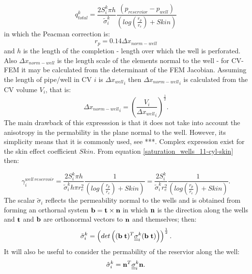 \begin{equation}
q_{total}^k = \frac{2 S_i^k \pi h}{\tilde\sigma_i^{k} }\frac{(p_{reservior}- p_{well})}{ ( log(\frac{r_p}{r_e}) + Skin)}
\label{saturation_wells_11-cyl-skin}
\end{equation}
in which the Peacman correction is:
\begin{equation}
r_p= 0.14 \Delta x_{norm-well}
\end{equation}
and $h$ is the length of the completion - length over which the well is perforated. Also $\Delta x_{norm-well}$
is  the length scale of the elements normal to the well - for CV-FEM it may be calculated from the determinant of the FEM Jacobian.
Assuming the length of pipe/well in CV $i$ is ${\Delta x_{well}}_i$ then ${\Delta x_{norm-well}}_i$ is
calculated from the CV volume $V_i$, that is:
\begin{equation}
 {\Delta x_{norm-well}}_i = \left(
\frac{V_i}{ {\Delta x_{well}}_i }
\right)^\frac{1}{2} .
\end{equation}
The main drawback of this expresssion is that it does not take into account
the anisotropy in the permability in the plane normal to the well. However, its simplicity means that it is commonly
used, see ***.
Complex expression exist for the skin effect coefficient $Skin$.
From equation \ref{saturation_wells_11-cyl-skin} then:

\begin{equation}
\gamma_{i}^{well\, reservoir}
=\frac{2 S_i^k \pi h}{ \tilde\sigma_i^k h\pi r_e^2} \frac{1}{ ( log(\frac{r_p}{r_e}) + Skin)}
=\frac{2 S_i^k }{\tilde\sigma_i^k r_e^2} \frac{1}{ ( log(\frac{r_p}{r_e}) + Skin)}
 .
\label{saturation_wells_15-well10reservoir-cyl-skin}
\end{equation}
The scalar $\tilde\sigma_i$ reflects the permeability normal to the wells
and is obtained from forming an orthornal system ${\bf b}={\bf t}\times {\bf n}$ in which $\bf n$ is the direction
along the wells and $\bf t$ and $\bf b$ are orthonormal vectors to $\bf n$ and themselves; then:
\begin{equation}
\tilde\sigma_i^k = \left( det\left( ({\bf b} \; {\bf t})^T \underline{\underline\sigma}_i^k ({\bf b} \; {\bf t}) \right) \right)^{\frac{1}{2}}.
\label{perm-well-orthogonal}
\end{equation}
It will also be useful to consider the permability of the reservior along the well:
\begin{equation}
\hat\sigma_i^k =  {\bf n}^T \underline{\underline\sigma}_i^k {\bf n} .
\label{perm-well-orthogonal}
\end{equation}




